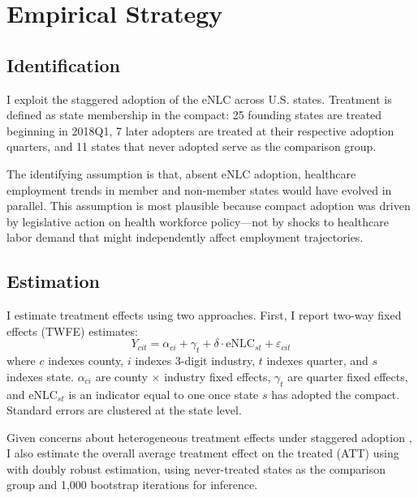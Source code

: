 \documentclass[12pt]{article}
\begin{document}
\section{Empirical Strategy}

\subsection{Identification}

I exploit the staggered adoption of the eNLC across U.S. states. Treatment is defined as state membership in the compact: 25 founding states are treated beginning in 2018Q1, 7 later adopters are treated at their respective adoption quarters, and 11 states that never adopted serve as the comparison group.

The identifying assumption is that, absent eNLC adoption, healthcare employment trends in member and non-member states would have evolved in parallel. This assumption is most plausible because compact adoption was driven by legislative action on health workforce policy---not by shocks to healthcare labor demand that might independently affect employment trajectories.

\subsection{Estimation}

I estimate treatment effects using two approaches. First, I report two-way fixed effects (TWFE) estimates:
\begin{equation}
Y_{cit} = \alpha_{ci} + \gamma_t + \delta \cdot \text{eNLC}_{st} + \varepsilon_{cit}
\label{eq:twfe}
\end{equation}
where $c$ indexes county, $i$ indexes 3-digit industry, $t$ indexes quarter, and $s$ indexes state. $\alpha_{ci}$ are county $\times$ industry fixed effects, $\gamma_t$ are quarter fixed effects, and $\text{eNLC}_{st}$ is an indicator equal to one once state $s$ has adopted the compact. Standard errors are clustered at the state level.

Given concerns about heterogeneous treatment effects under staggered adoption \citep{goodman2021difference}, I also estimate the overall average treatment effect on the treated (ATT) using \citet{callaway2021difference} with doubly robust estimation, using never-treated states as the comparison group and 1,000 bootstrap iterations for inference.
\end{document}
